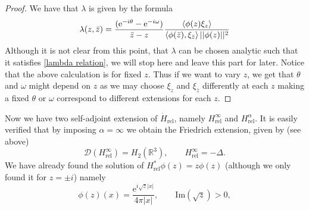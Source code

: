 \documentclass[a4paper,11pt]{article}
\newcommand{\euler}[1]{\text{e}^{#1}}
\newcommand{\Imag}{\text{Im}}
\newcommand{\dom}[1]{\mathscr D\left(#1\right)}
\newcommand{\R}{\mathbb{R}}
\begin{document}
\begin{proof}
	We have that $ \lambda $ is given by the formula \begin{equation}
	\lambda(z,\bar{z})=\frac{(\euler{-i\theta}-\euler{-i\omega})}{\bar{z}-z}\frac{\braket{\phi(z)\xi_{z}}}{\braket{\phi(\bar{z}),\xi_{\bar{z}}}||\phi(z)||^2}
	\end{equation}
	Although it is not clear from this point, that $ \lambda $ can be chosen analytic such that it satisfies \eqref{lambda relation}, we will stop here and leave this part for later. Notice that the above calculation is for fixed $ z $. Thus if we want to vary $ z $, we get that $ \theta $ and $ \omega $ might depend on $ z $ as we may choose $ \xi_z $ and $ \xi_{\bar{z}} $ differently at each $ z $ making a fixed $ \theta $ or $ \omega $ correspond to different extensions for  each $ z $.
\end{proof}
Now we have two self-adjoint extension of $ \dot{H}_{\text{rel}} $, namely $ H_{\text{rel}}^\infty $ and $ H_{\text{rel}}^{\alpha} $. It is easily verified that by imposing $ \alpha=\infty $ we obtain the Friedrich extension, given by (see above)\begin{equation}
\dom{H_{\text{rel}}^\infty}=H_2(\R^3),\qquad H_{\text{rel}}^\infty=-\Delta.
\end{equation}  We have already found the solution of $ H_{\text{rel}}^*\phi(z)=z\phi(z) $ (although we only found it for $ z=\pm i $) namely\begin{equation}
\phi(z)(x)=\frac{\euler{i\sqrt{z}|x|}}{4\pi|x|},\qquad \Imag(\sqrt{z})>0,
\end{equation}
\end{document}
